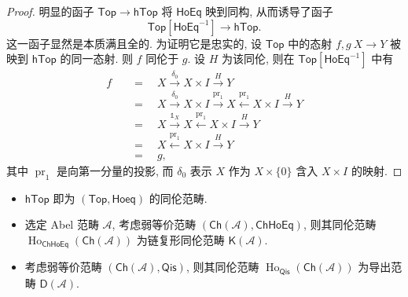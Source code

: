 \begin{proof}
    明显的函子 $\mathsf{Top}\to\mathsf{hTop}$
    将 $\mathsf{HoEq}$ 映到同构,
    从而诱导了函子
    \[
        \mathsf{Top}[\mathsf{HoEq}^{-1}]\to\mathsf{hTop}.
    \]
    这一函子显然是本质满且全的.
    为证明它是忠实的, 设 $\mathsf{Top}$ 中的态射 $f, g \: X \to Y$
    被映到 $\mathsf{hTop}$ 的同一态射.
    则 $f$ 同伦于 $g$. 设 $H$ 为该同伦,
    则在 $\mathsf{Top}[\mathsf{HoEq}^{-1}]$ 中有
    \[ \begin{aligned}
        f \quad &= \quad X \xrightarrow{\delta_0} X \times I \xrightarrow{H} Y \\
        &= \quad X \xrightarrow{\delta_0} X \times I
        \xrightarrow{\operatorname{pr}_1} X
        \xleftarrow{\operatorname{pr}_1} X \times I \xrightarrow{H} Y \\
        &= \quad X \xrightarrow{\mathbb{1}_X} X
        \xleftarrow{\operatorname{pr}_1} X \times I \xrightarrow{H} Y \\
        &= \quad X \xleftarrow{\operatorname{pr}_1} X \times I \xrightarrow{H} Y \\
        &= \quad g,
    \end{aligned} \]
    其中 $\operatorname{pr}_1$ 是向第一分量的投影,
    而 $\delta_0$ 表示 $X$ 作为 $X \times \{0\}$ 含入 $X \times I$ 的映射.
\end{proof}
\begin{example}
\begin{itemize}
    \item $\mathsf{hTop}$ 即为 $(\mathsf{Top},\mathsf{Hoeq})$ 的同伦范畴.
    \item 选定 Abel 范畴 $\mathcal{A}$, 考虑弱等价范畴 $(\mathsf{Ch}(\mathcal{A}),\mathsf{ChHoEq})$, 
    则其同伦范畴 $\operatorname{Ho}_{\mathsf{ChHoEq}}(\mathsf{Ch}(\mathcal{A}))$ 为链复形同伦范畴 
    $\mathsf{K}(\mathcal{A})$.
    \item 考虑弱等价范畴 $(\mathsf{Ch}(\mathcal{A}),\mathsf{Qis})$, 则其同伦范畴 $\operatorname{Ho}_{\mathsf{Qis}}(\mathsf{Ch}(\mathcal{A}))$ 为导出范畴 $\mathsf{D}(\mathcal{A})$.
\end{itemize}
\end{example}
